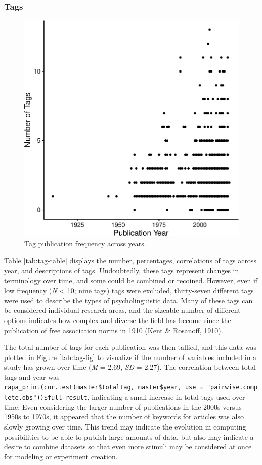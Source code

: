 \documentclass[english,man]{apa6}
\theoremstyle{definition}
\theoremstyle{definition}
\theoremstyle{definition}
\theoremstyle{remark}
\begin{document}
\subsubsection{Tags}\label{tags}

\begin{figure}
\centering
\includegraphics{LAB_files/figure-latex/tag-fig-1.pdf}
\caption{\label{fig:tag-fig}Tag publication frequency across years.}
\end{figure}

Table \ref{tab:tag-table} displays the number, percentages, correlations
of tags across year, and descriptions of tags. Undoubtedly, these tags
represent changes in terminology over time, and some could be combined
or recoined. However, even if low frequency (\emph{N} \textless{} 10;
nine tags) tags were excluded, thirty-seven different tags were used to
describe the types of psycholinguistic data. Many of these tags can be
considered individual research areas, and the sizeable number of
different options indicates how complex and diverse the field has become
since the publication of free association norms in 1910 (Kent \&
Rosanoff, 1910).

The total number of tags for each publication was then tallied, and this
data was plotted in Figure \ref{tab:tag-fig} to visualize if the number
of variables included in a study has grown over time (\emph{M} = 2.69,
\emph{SD} = 2.27). The correlation between total tags and year was
\texttt{rapa\_print(cor.test(master\$totaltag,\ master\$year,\ use\ =\ "pairwise.complete.obs"))\$full\_result},
indicating a small increase in total tags used over time. Even
considering the larger number of publications in the 2000s versus 1950s
to 1970s, it appeared that the number of keywords for articles was also
slowly growing over time. This trend may indicate the evolution in
computing possibilities to be able to publish large amounts of data, but
also may indicate a desire to combine datasets so that even more stimuli
may be considered at once for modeling or experiment creation.
\end{document}
